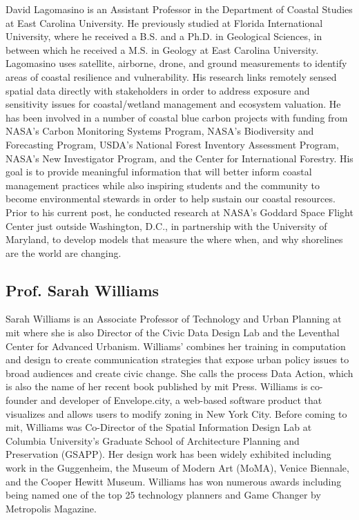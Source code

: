 \documentclass[notitlepage]{article}
\begin{document}
David Lagomasino is an Assistant Professor in the Department of Coastal Studies at East Carolina University. He previously studied at Florida International University, where he received a B.S. and a Ph.D. in Geological Sciences, in between which he received a M.S. in Geology at East Carolina University. Lagomasino uses satellite, airborne, drone, and ground measurements to identify areas of coastal resilience and vulnerability. His research links remotely sensed spatial data directly with stakeholders in order to address exposure and sensitivity issues for coastal/wetland management and ecosystem valuation. He has been involved in a number of  coastal blue carbon projects with funding from NASA’s Carbon Monitoring Systems Program,  NASA’s Biodiversity and Forecasting Program, USDA’s National Forest Inventory Assessment Program,  NASA’s New Investigator Program, and the Center for International Forestry. His goal is to provide meaningful information that will better inform coastal management practices while also inspiring students and the community to become environmental stewards in order to help sustain our coastal resources. Prior to his current post, he conducted research at NASA’s Goddard Space Flight Center just outside Washington, D.C., in partnership with the University of Maryland, to develop models that measure the where when, and why shorelines are the world are changing.

\subsection*{Prof. Sarah Williams}

Sarah Williams is an Associate Professor of Technology and Urban Planning at \ac{mit} where she is also Director of the Civic Data Design Lab and the Leventhal Center for Advanced Urbanism. Williams’ combines her training in computation and design to create communication strategies that expose urban policy issues to broad audiences and create civic change. She calls the process Data Action, which is also the name of her recent book published by \ac{mit} Press. Williams is co-founder and developer of Envelope.city, a web-based software product that visualizes and allows users to modify zoning in New York City.  Before coming to \ac{mit}, Williams was Co-Director of the Spatial Information Design Lab at Columbia University’s Graduate School of Architecture Planning and Preservation (GSAPP). Her design work has been widely exhibited including work in the Guggenheim, the Museum of Modern Art (MoMA), Venice Biennale, and the Cooper Hewitt Museum. Williams has won numerous awards including being named one of the top 25 technology planners and Game Changer by Metropolis Magazine. 
\end{document}
